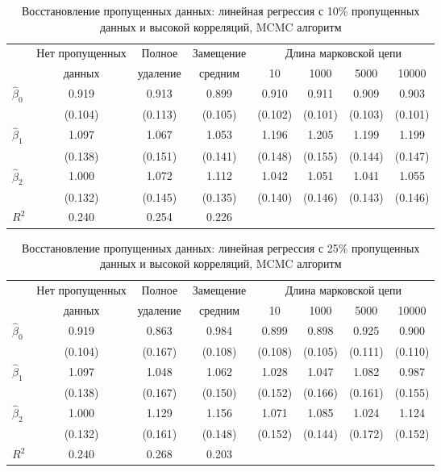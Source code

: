 \begin{table}[h]
\begin{center}
\caption{\label{tab:27.2} Восстановление пропущенных данных: линейная регрессия с 10\% пропущенных данных и высокой корреляций, MCMC алгоритм}
\begin{tabular}[t]{lccccccc}
\hline
\hline
 & Нет пропущенных & Полное & Замещение & \multicolumn{4}{c}{Длина марковской цепи} \\
 & данных & удаление & средним  & 10 & 1000 & 5000 & 10000 \\
\hline
$\hat{\beta}_0$  &  0.919 & 0.913 & 0.899 & 0.910 & 0.911 & 0.909 & 0.903 \\
& (0.104) & (0.113)& (0.105) & (0.102) & (0.101) & (0.103) & (0.101) \\
$\hat{\beta}_1$  &  1.097 & 1.067 & 1.053 & 1.196 & 1.205 & 1.199 & 1.199 \\
& (0.138) & (0.151) & (0.141) & (0.148) & (0.155) & (0.144) & (0.147) \\
$\hat{\beta}_2$  &  1.000 & 1.072 & 1.112 & 1.042 & 1.051 & 1.041 & 1.055 \\
& (0.132) & (0.145) & (0.135) & (0.140) & (0.146) & (0.143) & (0.146) \\
$R^2$ & 0.240 & 0.254 & 0.226 & & & & \\
\hline
\hline
\end{tabular}
\end{center}
\end{table}


\begin{table}[h]
\begin{center}
\caption{\label{tab:27.3} Восстановление пропущенных данных: линейная регрессия с 25\% пропущенных данных и высокой корреляций, MCMC алгоритм}
\begin{tabular}[t]{lccccccc}
\hline
\hline
 & Нет пропущенных & Полное & Замещение & \multicolumn{4}{c}{Длина марковской цепи} \\
 & данных & удаление & средним  & 10 & 1000 & 5000 & 10000 \\
\hline
$\hat{\beta}_0$  &  0.919 & 0.863 & 0.984 & 0.899 & 0.898 & 0.925 &  0.900 \\
& (0.104) & (0.167) & (0.108) & (0.108) & (0.105) & (0.111) & (0.110) \\
$\hat{\beta}_1$  &  1.097 &  1.048 & 1.062 & 1.028 & 1.047 & 1.082 & 0.987 \\
&  (0.138) & (0.167) & (0.150) & (0.152) & (0.166) & (0.161) & (0.155) \\
$\hat{\beta}_2$  &  1.000 & 1.129 &  1.156 & 1.071 & 1.085 &  1.024 & 1.124 \\
&  (0.132) & (0.161) & (0.148) & (0.152) & (0.144) & (0.172) & (0.152)  \\
$R^2$ & 0.240 & 0.268 & 0.203 & & & & \\
\hline
\hline
\end{tabular}
\end{center}
\end{table}

